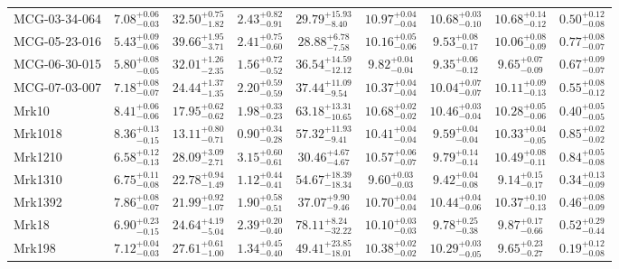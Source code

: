 \documentclass[onecolumn]{mn2e}
\begin{document}
{\begin{center}
\begin{longtable}{lcccccccc}
MCG-03-34-064 & $7.08_{-0.03}^{+0.06}$ & $32.50_{-1.82}^{+0.75}$ & $2.43_{-0.91}^{+0.82}$ &$29.79_{-8.40}^{+15.93}$ & $10.97_{-0.04}^{+0.04}$ & $10.68_{-0.10}^{+0.03}$ & $10.68_{-0.12}^{+0.14}$ & $0.50_{-0.08}^{+0.12}$ \\
MCG-05-23-016 & $5.43_{-0.06}^{+0.09}$ & $39.66_{-3.71}^{+1.95}$ & $2.41_{-0.60}^{+0.75}$ &$28.88_{-7.58}^{+6.78}$ & $10.16_{-0.06}^{+0.05}$ & $9.53_{-0.17}^{+0.08}$ & $10.06_{-0.09}^{+0.08}$ & $0.77_{-0.07}^{+0.08}$ \\
MCG-06-30-015 & $5.80_{-0.05}^{+0.08}$ & $32.01_{-2.35}^{+1.26}$ & $1.56_{-0.52}^{+0.72}$ &$36.54_{-12.12}^{+14.59}$ & $9.82_{-0.04}^{+0.04}$ & $9.35_{-0.12}^{+0.06}$ & $9.65_{-0.09}^{+0.07}$ & $0.67_{-0.07}^{+0.09}$ \\
MCG-07-03-007 & $7.18_{-0.07}^{+0.08}$ & $24.44_{-1.35}^{+1.37}$ & $2.20_{-0.59}^{+0.59}$ &$37.44_{-9.54}^{+11.09}$ & $10.37_{-0.04}^{+0.04}$ & $10.04_{-0.07}^{+0.07}$ & $10.11_{-0.13}^{+0.09}$ & $0.55_{-0.12}^{+0.08}$ \\
Mrk10 & $8.41_{-0.06}^{+0.06}$ & $17.95_{-0.62}^{+0.62}$ & $1.98_{-0.23}^{+0.33}$ &$63.18_{-10.65}^{+13.31}$ & $10.68_{-0.02}^{+0.02}$ & $10.46_{-0.04}^{+0.03}$ & $10.28_{-0.06}^{+0.05}$ & $0.40_{-0.05}^{+0.05}$ \\
Mrk1018 & $8.36_{-0.15}^{+0.13}$ & $13.11_{-0.71}^{+0.80}$ & $0.90_{-0.28}^{+0.34}$ &$57.32_{-9.41}^{+11.93}$ & $10.41_{-0.04}^{+0.04}$ & $9.59_{-0.04}^{+0.04}$ & $10.33_{-0.05}^{+0.04}$ & $0.85_{-0.02}^{+0.02}$ \\
Mrk1210 & $6.58_{-0.13}^{+0.12}$ & $28.09_{-2.71}^{+3.09}$ & $3.15_{-0.61}^{+0.60}$ &$30.46_{-4.67}^{+4.67}$ & $10.57_{-0.07}^{+0.06}$ & $9.79_{-0.14}^{+0.14}$ & $10.49_{-0.11}^{+0.08}$ & $0.84_{-0.08}^{+0.05}$ \\
Mrk1310 & $6.75_{-0.08}^{+0.11}$ & $22.78_{-1.49}^{+0.94}$ & $1.12_{-0.41}^{+0.44}$ &$54.67_{-18.34}^{+18.39}$ & $9.60_{-0.03}^{+0.03}$ & $9.42_{-0.08}^{+0.04}$ & $9.14_{-0.17}^{+0.15}$ & $0.34_{-0.09}^{+0.13}$ \\
Mrk1392 & $7.86_{-0.07}^{+0.08}$ & $21.99_{-1.07}^{+0.92}$ & $1.90_{-0.51}^{+0.58}$ &$37.07_{-9.46}^{+9.90}$ & $10.70_{-0.04}^{+0.04}$ & $10.44_{-0.06}^{+0.04}$ & $10.37_{-0.13}^{+0.10}$ & $0.46_{-0.09}^{+0.08}$ \\
Mrk18 & $6.90_{-0.15}^{+0.23}$ & $24.64_{-5.04}^{+4.19}$ & $2.39_{-0.40}^{+0.20}$ &$78.11_{-32.22}^{+8.24}$ & $10.10_{-0.03}^{+0.03}$ & $9.78_{-0.38}^{+0.25}$ & $9.87_{-0.66}^{+0.17}$ & $0.52_{-0.44}^{+0.29}$ \\
Mrk198 & $7.12_{-0.03}^{+0.04}$ & $27.61_{-1.00}^{+0.61}$ & $1.34_{-0.40}^{+0.45}$ &$49.41_{-18.01}^{+23.85}$ & $10.38_{-0.02}^{+0.02}$ & $10.29_{-0.05}^{+0.03}$ & $9.65_{-0.27}^{+0.23}$ & $0.19_{-0.08}^{+0.12}$ \\

\end{longtable}
\end{center}}
\end{document}
